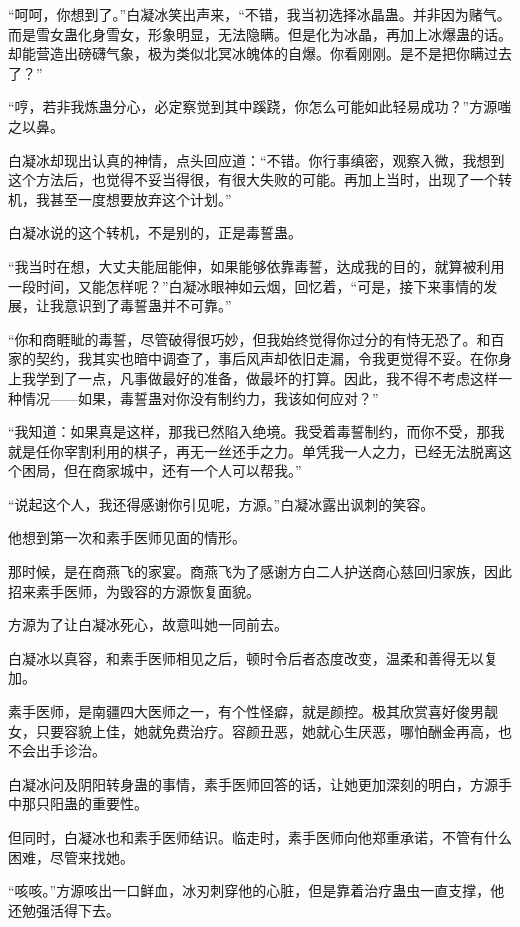 \begin{this_body}
“呵呵，你想到了。”白凝冰笑出声来，“不错，我当初选择冰晶蛊。并非因为赌气。而是雪女蛊化身雪女，形象明显，无法隐瞒。但是化为冰晶，再加上冰爆蛊的话。却能营造出磅礴气象，极为类似北冥冰魄体的自爆。你看刚刚。是不是把你瞒过去了？”

“哼，若非我炼蛊分心，必定察觉到其中蹊跷，你怎么可能如此轻易成功？”方源嗤之以鼻。

白凝冰却现出认真的神情，点头回应道：“不错。你行事缜密，观察入微，我想到这个方法后，也觉得不妥当得很，有很大失败的可能。再加上当时，出现了一个转机，我甚至一度想要放弃这个计划。”

白凝冰说的这个转机，不是别的，正是毒誓蛊。

“我当时在想，大丈夫能屈能伸，如果能够依靠毒誓，达成我的目的，就算被利用一段时间，又能怎样呢？”白凝冰眼神如云烟，回忆着，“可是，接下来事情的发展，让我意识到了毒誓蛊并不可靠。”

“你和商睚眦的毒誓，尽管破得很巧妙，但我始终觉得你过分的有恃无恐了。和百家的契约，我其实也暗中调查了，事后风声却依旧走漏，令我更觉得不妥。在你身上我学到了一点，凡事做最好的准备，做最坏的打算。因此，我不得不考虑这样一种情况——如果，毒誓蛊对你没有制约力，我该如何应对？”

“我知道：如果真是这样，那我已然陷入绝境。我受着毒誓制约，而你不受，那我就是任你宰割利用的棋子，再无一丝还手之力。单凭我一人之力，已经无法脱离这个困局，但在商家城中，还有一个人可以帮我。”

“说起这个人，我还得感谢你引见呢，方源。”白凝冰露出讽刺的笑容。

他想到第一次和素手医师见面的情形。

那时候，是在商燕飞的家宴。商燕飞为了感谢方白二人护送商心慈回归家族，因此招来素手医师，为毁容的方源恢复面貌。

方源为了让白凝冰死心，故意叫她一同前去。

白凝冰以真容，和素手医师相见之后，顿时令后者态度改变，温柔和善得无以复加。

素手医师，是南疆四大医师之一，有个性怪癖，就是颜控。极其欣赏喜好俊男靓女，只要容貌上佳，她就免费治疗。容颜丑恶，她就心生厌恶，哪怕酬金再高，也不会出手诊治。

白凝冰问及阴阳转身蛊的事情，素手医师回答的话，让她更加深刻的明白，方源手中那只阳蛊的重要性。

但同时，白凝冰也和素手医师结识。临走时，素手医师向他郑重承诺，不管有什么困难，尽管来找她。

“咳咳。”方源咳出一口鲜血，冰刃刺穿他的心脏，但是靠着治疗蛊虫一直支撑，他还勉强活得下去。


\end{this_body}
